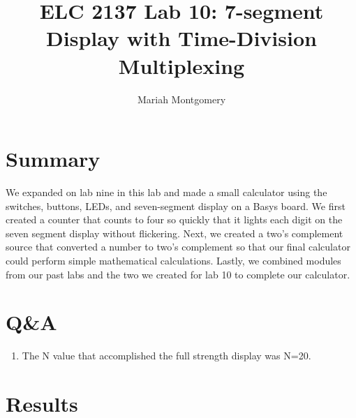 \documentclass[11pt]{article}
\begin{document}
\title{ELC 2137 Lab 10: 7-segment Display with Time-Division Multiplexing}
\author{Mariah Montgomery}

\maketitle


\section*{Summary}

We expanded on lab nine in this lab and made a small calculator using the switches, buttons, LEDs, and seven-segment display on a Basys board. We first created a counter that counts to four so quickly that it lights each digit on the seven segment display without flickering. Next, we created a two's complement source that converted a number to two's complement so that our final calculator could perform simple mathematical calculations. Lastly, we combined modules from our past labs and the two we created for lab 10 to complete our calculator.  


\section*{Q\&A}

\begin{enumerate}
	\item The N value that accomplished the full strength display was N=20.
\end{enumerate}


\section*{Results}
\end{document}
